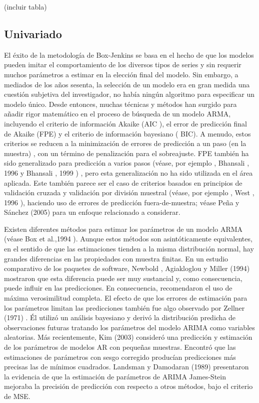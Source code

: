 \documentclass{llncs}
\begin{document}
(incluir tabla)

\subsection{Univariado}

El éxito de la metodología de Box-Jenkins se basa en el hecho de que los modelos pueden imitar el comportamiento de los diversos tipos de series y sin requerir muchos parámetros a estimar en la elección final del modelo. Sin embargo, a mediados de los años sesenta, la selección de un modelo era en gran medida una cuestión subjetiva del investigador, no había ningún algoritmo para especificar un modelo único. Desde entonces, muchas técnicas y métodos han surgido para añadir rigor matemático en el proceso de búsqueda de un modelo ARMA, incluyendo el criterio de información Akaike (AIC ), el error de predicción final de Akaike (FPE) y el criterio de información bayesiano ( BIC). A menudo, estos criterios se reducen a la minimización de errores de predicción a un paso (en la muestra) , con un término de penalización para el sobreajuste. FPE también ha sido generalizado para predicción a varios pasos (véase, por ejemplo , Bhansali , 1996 \cite{Bhansali1996577} y Bhansali , 1999 \cite{Bhansali1999295}) , pero esta generalización no ha sido utilizada en el área aplicada. Este también parece ser el caso de criterios basados en principios de validación cruzada y validación por división muestral (véase, por ejemplo , West , 1996 \cite{West19961084}), haciendo uso de errores de predicción fuera-de-muestra; véase Peña y Sánchez (2005) \cite{Peña2005135} para un enfoque relacionado a considerar.

Existen diferentes métodos para estimar los parámetros de un modelo ARMA (véase Box et al.,1994 \cite{Box1994}). Aunque estos métodos son asintóticamente equivalentes, en el sentido de que las estimaciones tienden a la misma distribución normal, hay grandes diferencias en las propiedades con muestra finitas. En un estudio comparativo de los paquetes de software, Newbold , Agiakloglou y Miller (1994)  \cite{Newbold1994573}mostraron que esta diferencia puede ser muy sustancial y, como consecuencia, puede influir en las predicciones. En consecuencia, recomendaron el uso de máxima verosimilitud completa. El efecto de que los errores de estimación para los parámetros limitan las predicciones también fue algo observado por Zellner (1971) \cite{Zellner1971}. Él utilizó un análisis bayesiano y derivó la distribución predicha de observaciones futuras tratando los parámetros del modelo ARIMA como variables aleatorias. Más recientemente,  Kim (2003) \cite{-} consideró una predicción y estimación de los parámetros de modelos AR con pequeñas muestras. Encontró que las estimaciones de parámetros con sesgo corregido producían predicciones más precisas las de mínimos cuadrados. Landsman y Damodaran (1989) \cite{Landsman1989491} presentaron la evidencia de que la estimación de parámetros de ARIMA James-Stein mejoraba la precisión de predicción con respecto a otros métodos, bajo el criterio de MSE.
\end{document}

